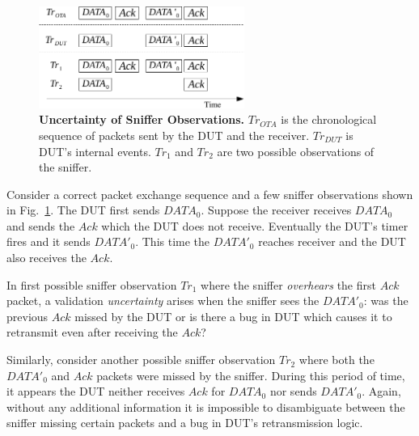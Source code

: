 \begin{figure}
  \vspace*{-5mm}
  \centering
  \includegraphics[width=0.6\textwidth]{./figures/false_pos.pdf}
  \caption{\textbf{Uncertainty of Sniffer Observations.} $Tr_{OTA}$ is
    the chronological sequence of packets sent by the DUT and the receiver.
    $Tr_{DUT}$ is DUT's internal events. $Tr_1$ and $Tr_2$ are two possible observations
  of the sniffer.}
  \label{fig:sniffer_in_middle}
  \vspace*{-5mm}
\end{figure}

Consider a correct packet exchange sequence and a few sniffer observations
shown in Fig.~\ref{fig:sniffer_in_middle}. The DUT first sends
$DATA_0$.  Suppose the receiver receives $DATA_0$ and sends the $Ack$ which the
DUT does not receive. Eventually the DUT's timer fires and it sends $DATA'_0$.
This time the $DATA'_0$ reaches receiver and the DUT also receives the $Ack$.

In first possible sniffer observation $Tr_1$ where the sniffer
\textit{overhears} the first $Ack$ packet, a validation \textit{uncertainty}
arises when the sniffer sees the $DATA'_0$: was the previous $Ack$ missed by the
DUT or is there a bug in DUT which causes it to retransmit even after receiving
the $Ack$?

Similarly, consider another possible sniffer observation $Tr_2$
where both the $DATA'_0$ and $Ack$ packets were missed by the sniffer.  During
this period of time, it appears the DUT neither receives $Ack$ for $DATA_0$ nor
sends $DATA'_0$.  Again, without any additional information it is impossible to
disambiguate between the sniffer missing certain packets and a bug in DUT's
retransmission logic.

